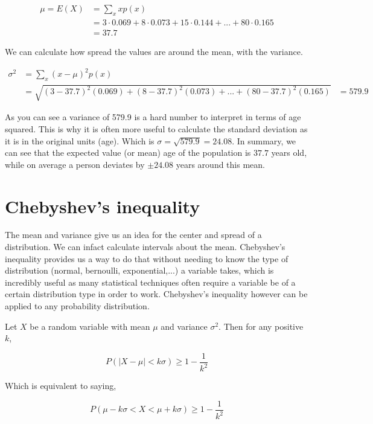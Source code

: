 \begin{align*}
	\mu = E(X) & = \sum_{x}xp(x) \\
	& = 3\cdot 0.069 + 8\cdot 0.073 + 15\cdot 0.144 + ... + 80\cdot 0.165 \\
	& = 37.7
\end{align*}

We can calculate how spread the values are around the mean, with the variance.

\begin{align*}
	\sigma ^2 & = \sum_{x}(x-\mu)^{2}p(x) \\
	& = \sqrt{(3-37.7)^2(0.069) + (8-37.7)^2(0.073) + ... + (80-37.7)^2(0.165)}
	& = 579.9
\end{align*}

As you can see a variance of 579.9 is a hard number to interpret in terms of age squared. This is why it is often more useful
to calculate the standard deviation as it is in the original units (age). Which is $\sigma = \sqrt{579.9} = 24.08$. In summary, we can
see that the expected value (or mean) age of the population is $37.7$ years old, while on average a person deviates by $\pm 24.08$ years around this mean.

\section{Chebyshev's inequality}
The mean and variance give us an idea for the center and spread of a distribution. We can infact calculate intervals about the mean. Chebyshev's inequality
provides us a way to do that without needing to know the type of distribution (normal, bernoulli, exponential,...) a variable takes, which is incredibly useful
as many statistical techniques often require a variable be of a certain distribution type in order to work. Chebyshev's inequality however can be applied to
any probability distribution.\newline

Let $X$ be a random variable with mean $\mu$ and variance $\sigma ^2$. Then for any positive $k$,

\begin{equation*}
	P(| X - \mu | < k\sigma) \geq 1 - \frac{1}{k^2}
\end{equation*}

Which is equivalent to saying,

\begin{equation*}
	P(\mu - k\sigma < X < \mu + k\sigma) \geq 1 - \frac{1}{k^2}
\end{equation*}

